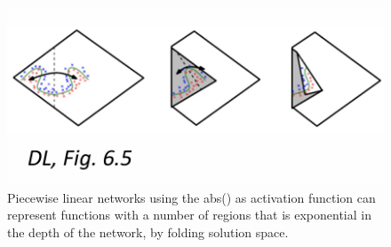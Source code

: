 \documentclass[../Main.tex]{subfiles}
\begin{document}
\begin{figure}[H]
    \centering
    \includegraphics[width=0.5\linewidth]{Images/absfolding.png}
    \caption{Piecewise linear 
    networks using the abs() as activation 
    function can represent functions with a 
    number of regions that is exponential in 
    the depth of the network, by folding solution space.}
\end{figure}
\end{document}
